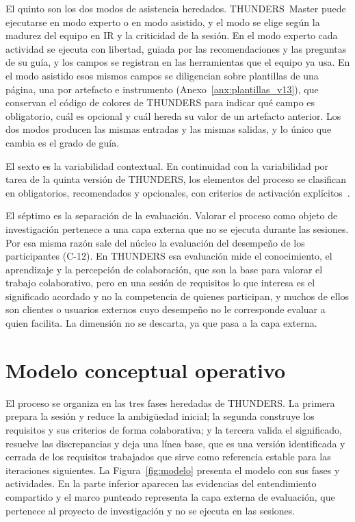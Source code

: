\documentclass[12pt,letterpaper,oneside]{report}
\begin{document}
El quinto son los dos modos de asistencia heredados. THUNDERS~Master puede
ejecutarse en modo experto o en modo asistido, y el modo se elige según la
madurez del equipo en IR y la criticidad de la sesión. En el modo experto cada
actividad se ejecuta con libertad, guiada por las recomendaciones y las
preguntas de su guía, y los campos se registran en las herramientas que el
equipo ya usa. En el modo asistido esos mismos campos se diligencian sobre
plantillas de una página, una por artefacto e instrumento
(Anexo~\ref{anx:plantillas_v13}), que conservan el código de colores de THUNDERS
para indicar qué campo es obligatorio, cuál es opcional y cuál hereda su valor
de un artefacto anterior. Los dos modos producen las mismas entradas y las
mismas salidas, y lo único que cambia es el grado de guía.

El sexto es la variabilidad contextual. En continuidad con la variabilidad por
tarea de la quinta versión de THUNDERS, los elementos del proceso se clasifican
en obligatorios, recomendados y opcionales, con criterios de activación
explícitos~\cite{kalus2013tailoring,campanelli2015agile}.

El séptimo es la separación de la evaluación. Valorar el proceso como objeto de
investigación pertenece a una capa externa que no se ejecuta durante las
sesiones. Por esa misma razón sale del núcleo la evaluación del desempeño de
los participantes (C-12). En THUNDERS esa evaluación mide el conocimiento, el
aprendizaje y la percepción de colaboración, que son la base para valorar el
trabajo colaborativo, pero en una sesión de requisitos lo que interesa es el
significado acordado y no la competencia de quienes participan, y muchos de
ellos son clientes o usuarios externos cuyo desempeño no le corresponde evaluar
a quien facilita. La dimensión no se descarta, ya que pasa a la capa externa.

\section{Modelo conceptual operativo}
\label{sec:modelo}
El proceso se organiza en las tres fases heredadas de THUNDERS. La primera
prepara la sesión y reduce la ambigüedad inicial; la segunda construye los
requisitos y sus criterios de forma colaborativa; y la tercera valida el
significado, resuelve las discrepancias y deja una línea base, que es una
versión identificada y cerrada de los requisitos trabajados que sirve como
referencia estable para las iteraciones siguientes. La Figura~\ref{fig:modelo}
presenta el modelo con sus fases y actividades. En la parte inferior aparecen
las evidencias del entendimiento compartido y el marco punteado representa la
capa externa de evaluación, que pertenece al proyecto de investigación y no se
ejecuta en las sesiones.
\end{document}
